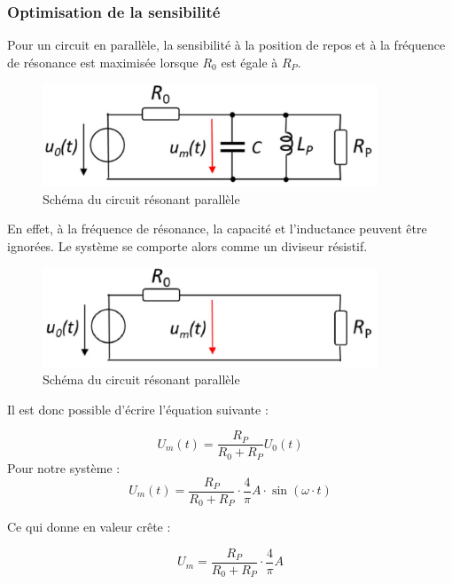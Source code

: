 \subsubsection{Optimisation de la sensibilité}

Pour un circuit en parallèle, la sensibilité à la position de repos et à la fréquence de résonance
est maximisée lorsque $R_0$ est égale à $R_P$.

\begin{figure}[H]
    \centering
    \includegraphics[width=10cm]{Images/Seance2/Circuit_para.png}
    \caption{Schéma du circuit résonant parallèle}
    \label{fig:circ_res_para}
\end{figure}

\vspace{0,2cm}

En effet, à la fréquence de résonance, la capacité et l'inductance peuvent être ignorées. Le système
se comporte alors comme un diviseur résistif.
\begin{figure}[H]
    \centering
    \includegraphics[width=10cm]{Images/Seance2/Circuit_ressss.png}
    \caption{Schéma du circuit résonant parallèle}
    \label{fig:circ_ressss}
\end{figure}

Il est donc possible d'écrire l'équation suivante :

\begin{equation*}
    U_m(t) = \frac{R_P}{R_0+R_P}U_0(t)
\end{equation*}
Pour notre système :
\begin{equation*}
    U_m(t) = \frac{R_P}{R_0+R_P}\cdot\frac{4}{\pi} A \cdot \sin(\omega \cdot t) 
\end{equation*}

Ce qui donne en valeur crête :

\begin{equation}
    U_m = \frac{R_P}{R_0+R_P}\cdot\frac{4}{\pi} A 
    \label{eq:crete}
\end{equation}

